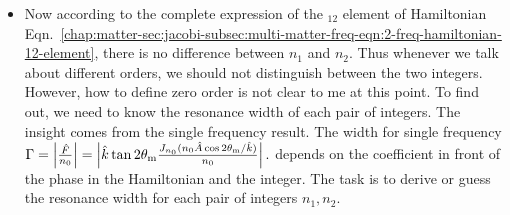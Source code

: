 \begin{itemize}
\item Now according to the complete expression of the ${}_{12}$ element of Hamiltonian Eqn.~\ref{chap:matter-sec:jacobi-subsec:multi-matter-freq-eqn:2-freq-hamiltonian-12-element}, there is no difference between $n_1$ and $n_2$. Thus whenever we talk about different orders, we should not distinguish between the two integers. However, how to define zero order is not clear to me at this point. To find out, we need to know the resonance width of each pair of integers. The insight comes from the single frequency result. The width for single frequency $\Gamma = \left\lvert \frac{\hat F}{n_0} \right\rvert = \left\lvert \hat k \tan 2\theta_\mathrm m \frac{ J_{n_0}( n_0 \hat A \cos 2\theta_\mathrm m/\hat k )}{n_0} \right\rvert .
$ depends on the coefficient in front of the phase in the Hamiltonian and the integer. The task is to derive or guess the resonance width for each pair of integers $n_1, n_2$.

\end{itemize}









